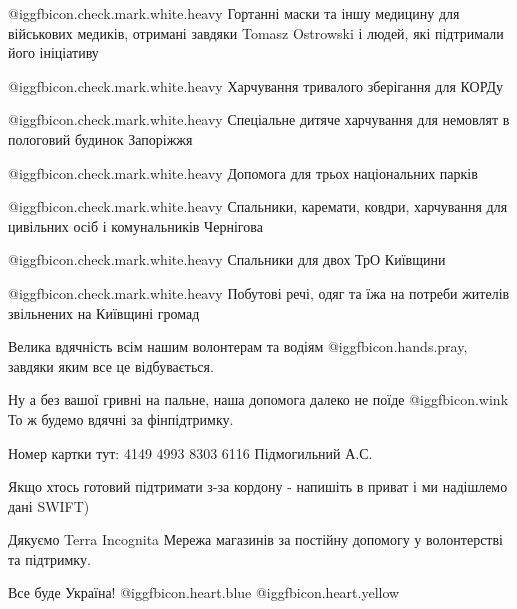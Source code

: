 @igg{fbicon.check.mark.white.heavy}  Гортанні маски та іншу медицину для
військових медиків, отримані завдяки Tomasz Ostrowski  і людей, які підтримали
його ініціативу 

@igg{fbicon.check.mark.white.heavy}  Харчування тривалого зберігання для КОРДу

@igg{fbicon.check.mark.white.heavy}  Спеціальне дитяче харчування для немовлят
в пологовий будинок Запоріжжя

@igg{fbicon.check.mark.white.heavy}  Допомога для трьох національних парків

@igg{fbicon.check.mark.white.heavy}  Спальники, каремати, ковдри, харчування
для цивільних осіб і комунальників Чернігова

@igg{fbicon.check.mark.white.heavy}  Спальники для двох ТрО Київщини 

@igg{fbicon.check.mark.white.heavy}  Побутові речі, одяг та їжа на потреби
жителів звільнених на Київщині громад

Велика вдячність всім нашим волонтерам та водіям @igg{fbicon.hands.pray}, завдяки яким все це
відбувається.

Ну а без вашої гривні на пальне, наша допомога далеко не поїде @igg{fbicon.wink}  То ж будемо
вдячні за фінпідтримку. 

Номер картки тут: 4149 4993 8303 6116 Підмогильний А.С. 

Якщо хтось готовий підтримати з-за кордону - напишіть в приват і ми надішлемо
дані SWIFT) 

Дякуємо Terra Incognita Мережа магазинів за постійну допомогу у волонтерстві та
підтримку.

Все буде Україна! @igg{fbicon.heart.blue}  @igg{fbicon.heart.yellow} 
